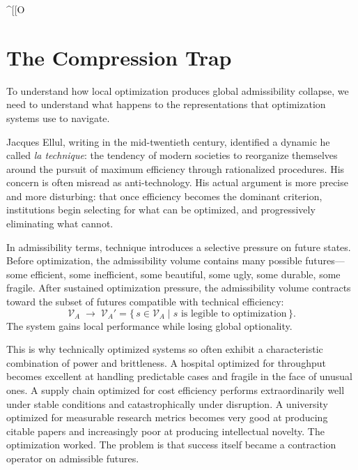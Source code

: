 \documentclass[11pt, letterpaper]{article}
\begin{document}
^[[O\section{The Compression Trap}

To understand how local optimization produces global admissibility collapse, we need to understand what happens to the representations that optimization systems use to navigate.

Jacques Ellul, writing in the mid-twentieth century, identified a dynamic he called \emph{la technique}: the tendency of modern societies to reorganize themselves around the pursuit of maximum efficiency through rationalized procedures. His concern is often misread as anti-technology. His actual argument is more precise and more disturbing: that once efficiency becomes the dominant criterion, institutions begin selecting for what can be optimized, and progressively eliminating what cannot.

In admissibility terms, technique introduces a selective pressure on future states. Before optimization, the admissibility volume contains many possible futures---some efficient, some inefficient, some beautiful, some ugly, some durable, some fragile. After sustained optimization pressure, the admissibility volume contracts toward the subset of futures compatible with technical efficiency:
\[
  \mathcal{V}_A \;\longrightarrow\; \mathcal{V}_A' = \bigl\{\,s \in \mathcal{V}_A \;\big|\; s \text{ is legible to optimization}\,\bigr\}.
\]
The system gains local performance while losing global optionality.

This is why technically optimized systems so often exhibit a characteristic combination of power and brittleness. A hospital optimized for throughput becomes excellent at handling predictable cases and fragile in the face of unusual ones. A supply chain optimized for cost efficiency performs extraordinarily well under stable conditions and catastrophically under disruption. A university optimized for measurable research metrics becomes very good at producing citable papers and increasingly poor at producing intellectual novelty. The optimization worked. The problem is that success itself became a contraction operator on admissible futures.
\end{document}
